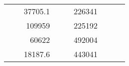\begin{table}[H]
\begin{tabular}{|ccrccrccc}
\multicolumn{1}{|c|}{\cellcolor[HTML]{FFFFC7}}                                & \multicolumn{1}{c|}{\cellcolor[HTML]{DAE8FC}}                      & \multicolumn{1}{r|}{\cellcolor[HTML]{DAE8FC}37705.1}   & \multicolumn{1}{c|}{\cellcolor[HTML]{FFFFC7}}                                & \multicolumn{1}{c|}{\cellcolor[HTML]{DAE8FC}}                       & \multicolumn{1}{r|}{\cellcolor[HTML]{DDFDFF}226341}    &                                                                              &                                                                    &                                                        \\ \cline{3-3} \cline{6-6}
\multicolumn{1}{|c|}{\cellcolor[HTML]{FFFFC7}}                                & \multicolumn{1}{c|}{\cellcolor[HTML]{DAE8FC}}                      & \multicolumn{1}{r|}{\cellcolor[HTML]{DDFDFF}109959}    & \multicolumn{1}{c|}{\cellcolor[HTML]{FFFFC7}}                                & \multicolumn{1}{c|}{\cellcolor[HTML]{DAE8FC}}                       & \multicolumn{1}{r|}{\cellcolor[HTML]{DAE8FC}225192}    &                                                                              &                                                                    &                                                        \\ \cline{3-3} \cline{6-6}
\multicolumn{1}{|c|}{\cellcolor[HTML]{FFFFC7}}                                & \multicolumn{1}{c|}{\cellcolor[HTML]{DAE8FC}}                      & \multicolumn{1}{r|}{\cellcolor[HTML]{DAE8FC}60622}     & \multicolumn{1}{c|}{\cellcolor[HTML]{FFFFC7}}                                & \multicolumn{1}{c|}{\cellcolor[HTML]{DAE8FC}}                       & \multicolumn{1}{r|}{\cellcolor[HTML]{DDFDFF}492004}    &                                                                              &                                                                    &                                                        \\ \cline{3-3} \cline{6-6}
\multicolumn{1}{|c|}{\cellcolor[HTML]{FFFFC7}}                                & \multicolumn{1}{c|}{\cellcolor[HTML]{DAE8FC}}                      & \multicolumn{1}{r|}{\cellcolor[HTML]{DDFDFF}18187.6}   & \multicolumn{1}{c|}{\cellcolor[HTML]{FFFFC7}}                                & \multicolumn{1}{c|}{\cellcolor[HTML]{DAE8FC}}                       & \multicolumn{1}{r|}{\cellcolor[HTML]{DAE8FC}443041}    &                                                                              &                                                                    &                                                        \\ \cline{3-3} \cline{6-6}

\end{tabular}
\end{table}
